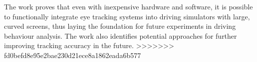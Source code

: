 The work proves that even with inexpensive hardware and software, it is possible to functionally integrate eye tracking systems into driving simulators with large, curved screens, thus laying the foundation for future experiments in driving behaviour analysis. The work also identifies potential approaches for further improving tracking accuracy in the future. 
>>>>>>> fd0befd8e95e2bae230d21ece8a1862eada6b577
